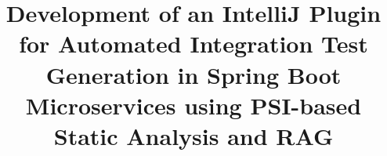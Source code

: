\documentclass[twoside,final]{hcmut-report}
\title{Development of an IntelliJ Plugin for Automated Integration Test Generation in Spring Boot Microservices using PSI-based Static Analysis and RAG}
\begin{document}
	\coverpage
	
	
	
	\tableofcontents
	\listoffigures
	\listoftables
	\clearpage
	
	
	
	
	\newpage
	
	
	\nocite{*}
\end{document}

